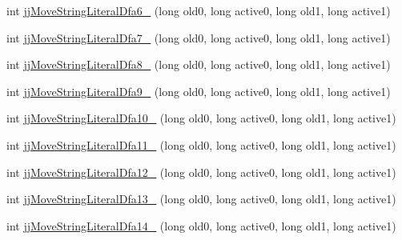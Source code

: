 \begin{DoxyCompactItemize}
\item 
int \hyperlink{classorg_1_1coode_1_1owlapi_1_1functionalparser_1_1_o_w_l_functional_syntax_parser_token_manager_ad46c6d95d7240f3e87fd1ad05e6e86cf}{jj\-Move\-String\-Literal\-Dfa6\-\_} (long old0, long active0, long old1, long active1)
\item 
int \hyperlink{classorg_1_1coode_1_1owlapi_1_1functionalparser_1_1_o_w_l_functional_syntax_parser_token_manager_a008d5aeb1981b2f2e3909086a282c0be}{jj\-Move\-String\-Literal\-Dfa7\-\_} (long old0, long active0, long old1, long active1)
\item 
int \hyperlink{classorg_1_1coode_1_1owlapi_1_1functionalparser_1_1_o_w_l_functional_syntax_parser_token_manager_a39afc5c0f8612012ee81ba91e8444dce}{jj\-Move\-String\-Literal\-Dfa8\-\_} (long old0, long active0, long old1, long active1)
\item 
int \hyperlink{classorg_1_1coode_1_1owlapi_1_1functionalparser_1_1_o_w_l_functional_syntax_parser_token_manager_ace279d5d63fadd0a071adc36452ed0b3}{jj\-Move\-String\-Literal\-Dfa9\-\_} (long old0, long active0, long old1, long active1)
\item 
int \hyperlink{classorg_1_1coode_1_1owlapi_1_1functionalparser_1_1_o_w_l_functional_syntax_parser_token_manager_aa3d1975ba48d43f5dc04e46a93d6c3a3}{jj\-Move\-String\-Literal\-Dfa10\-\_} (long old0, long active0, long old1, long active1)
\item 
int \hyperlink{classorg_1_1coode_1_1owlapi_1_1functionalparser_1_1_o_w_l_functional_syntax_parser_token_manager_a19323edc6fc6c9331130fdfd93d57e4d}{jj\-Move\-String\-Literal\-Dfa11\-\_} (long old0, long active0, long old1, long active1)
\item 
int \hyperlink{classorg_1_1coode_1_1owlapi_1_1functionalparser_1_1_o_w_l_functional_syntax_parser_token_manager_a87d02dd21dfe4b23ccf8c6d9ce6dedd4}{jj\-Move\-String\-Literal\-Dfa12\-\_} (long old0, long active0, long old1, long active1)
\item 
int \hyperlink{classorg_1_1coode_1_1owlapi_1_1functionalparser_1_1_o_w_l_functional_syntax_parser_token_manager_a8c30b8d122a77010e9c5f4ec484a0163}{jj\-Move\-String\-Literal\-Dfa13\-\_} (long old0, long active0, long old1, long active1)
\item 
int \hyperlink{classorg_1_1coode_1_1owlapi_1_1functionalparser_1_1_o_w_l_functional_syntax_parser_token_manager_a2600dc1f0462f0d256db3797e019eab0}{jj\-Move\-String\-Literal\-Dfa14\-\_} (long old0, long active0, long old1, long active1)
\item 

\end{DoxyCompactItemize}
